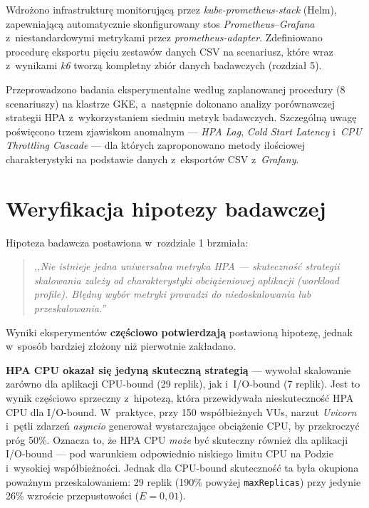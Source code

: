 Wdrożono infrastrukturę monitorującą przez \textit{kube-prometheus-stack} (Helm), zapewniającą automatycznie skonfigurowany stos \textit{Prometheus}--\textit{Grafana} z~niestandardowymi metrykami przez \textit{prometheus-adapter}. Zdefiniowano procedurę eksportu pięciu zestawów danych CSV na scenariusz, które wraz z~wynikami \textit{k6} tworzą kompletny zbiór danych badawczych (rozdział 5).

Przeprowadzono badania eksperymentalne według zaplanowanej procedury (8 scenariuszy) na klastrze GKE, a~następnie dokonano analizy porównawczej strategii HPA z~wykorzystaniem siedmiu metryk badawczych. Szczególną uwagę poświęcono trzem zjawiskom anomalnym — \textit{HPA Lag}, \textit{Cold Start Latency} i~\textit{CPU Throttling Cascade} — dla których zaproponowano metody ilościowej charakterystyki na podstawie danych z~eksportów CSV z~\textit{Grafany}.

\section{Weryfikacja hipotezy badawczej}

Hipoteza badawcza postawiona w~rozdziale 1 brzmiała:

\begin{quote}
\textit{,,Nie istnieje jedna uniwersalna metryka HPA — skuteczność strategii skalowania zależy od charakterystyki obciążeniowej aplikacji (\textit{workload profile}). Błędny wybór metryki prowadzi do niedoskalowania lub przeskalowania.''}
\end{quote}

Wyniki eksperymentów \textbf{częściowo potwierdzają} postawioną hipotezę, jednak w~sposób bardziej złożony niż pierwotnie zakładano.

\textbf{HPA CPU okazał się jedyną skuteczną strategią} — wywołał skalowanie zarówno dla aplikacji CPU-bound (29 replik), jak i~I/O-bound (7 replik). Jest to wynik częściowo sprzeczny z~hipotezą, która przewidywała nieskuteczność HPA CPU dla I/O-bound. W~praktyce, przy 150 współbieżnych VUs, narzut \textit{Uvicorn} i~pętli zdarzeń \textit{asyncio} generował wystarczające obciążenie CPU, by przekroczyć próg 50\%. Oznacza to, że HPA CPU \textit{może} być skuteczny również dla aplikacji I/O-bound — pod warunkiem odpowiednio niskiego limitu CPU na Podzie i~wysokiej współbieżności. Jednak dla CPU-bound skuteczność ta była okupiona poważnym przeskalowaniem: 29 replik (190\% powyżej \texttt{maxReplicas}) przy jedynie 26\% wzroście przepustowości ($E = 0{,}01$).

